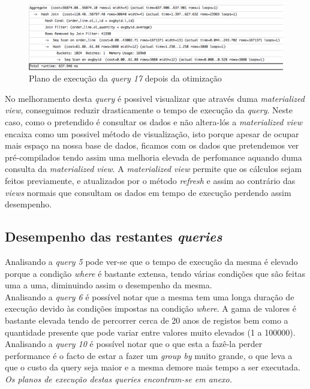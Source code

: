 \begin{figure}[ht!]
\centering
\includegraphics[width=\textwidth]{img/00_query17_pos}
\caption{Plano de execução da \textit{query 17} depois da otimização \label{overflow}}
\end{figure}


No melhoramento desta \textit{query} é possivel visualizar que através duma \textit{materialized view}, conseguimos reduzir drasticamente o tempo de execução da \textit{query}. Neste caso, como o pretendido é consultar os dados e não altera-lós a \textit{materialized view} encaixa como um possivel método de visualização, isto porque apesar de ocupar mais espaço na nossa base de dados, ficamos com os dados que pretendemos ver pré-compilados tendo assim uma melhoria elevada de perfomance aquando duma consulta da \textit{materialized view}. A \textit{materialized view} permite que os cálculos sejam feitos previamente, e atualizados por o método \textit{refresh} e assim ao contrário das \textit{views} normais que consultam os dados em tempo de execução perdendo assim desempenho.

\newpage

\subsection{Desempenho das restantes \textit{queries}}

Analisando a \textit{query 5} pode ver-se que o tempo de execução da mesma é elevado porque a condição \textit{where} é bastante extensa, tendo várias condições que são feitas uma a uma, diminuindo assim o desempenho da mesma.\\

Analisando a \textit{query 6} é possível notar que a mesma tem uma longa duração de execução devido às condições impostas na condição \textit{where}. A gama de valores é bastante elevada tendo de percorrer cerca de 20 anos de registos bem como a quantidade presente que pode variar entre valores muito elevados (1 a 100000).\\

Analisando a \textit{query 10} é possível notar que o que esta a fazê-la perder performance é o facto de estar a fazer um \textit{group by} muito grande, o que leva a que o custo da query seja maior e a mesma demore mais tempo a ser executada.\\

\textit{Os planos de execução destas queries encontram-se em anexo.}
